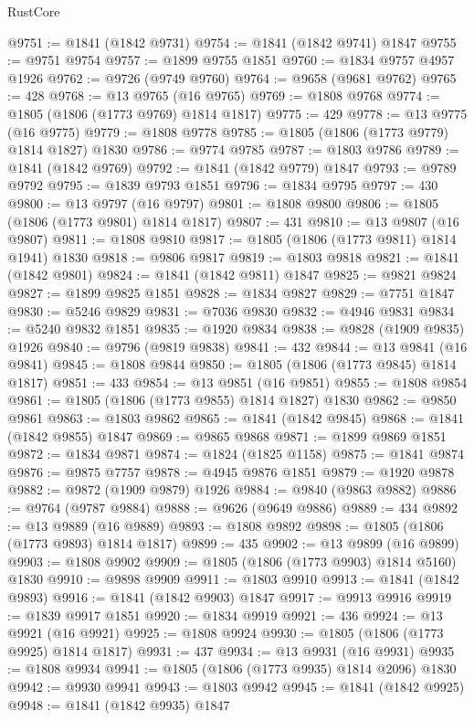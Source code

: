 \begin{lexlean}{RustCore}
\begin{coremodule}
@9751 := @1841 (@1842 @9731)
@9754 := @1841 (@1842 @9741) @1847
@9755 := @9751 @9754
@9757 := @1899 @9755 @1851
@9760 := @1834 @9757 @4957 @1926
@9762 := @9726 (@9749 @9760)
@9764 := @9658 (@9681 @9762)
@9765 := 428
@9768 := @13 @9765 (@16 @9765)
@9769 := @1808 @9768
@9774 := @1805 (@1806 (@1773 @9769) @1814 @1817)
@9775 := 429
@9778 := @13 @9775 (@16 @9775)
@9779 := @1808 @9778
@9785 := @1805 (@1806 (@1773 @9779) @1814 @1827) @1830
@9786 := @9774 @9785
@9787 := @1803 @9786
@9789 := @1841 (@1842 @9769)
@9792 := @1841 (@1842 @9779) @1847
@9793 := @9789 @9792
@9795 := @1839 @9793 @1851
@9796 := @1834 @9795
@9797 := 430
@9800 := @13 @9797 (@16 @9797)
@9801 := @1808 @9800
@9806 := @1805 (@1806 (@1773 @9801) @1814 @1817)
@9807 := 431
@9810 := @13 @9807 (@16 @9807)
@9811 := @1808 @9810
@9817 := @1805 (@1806 (@1773 @9811) @1814 @1941) @1830
@9818 := @9806 @9817
@9819 := @1803 @9818
@9821 := @1841 (@1842 @9801)
@9824 := @1841 (@1842 @9811) @1847
@9825 := @9821 @9824
@9827 := @1899 @9825 @1851
@9828 := @1834 @9827
@9829 := @7751 @1847
@9830 := @5246 @9829
@9831 := @7036 @9830
@9832 := @4946 @9831
@9834 := @5240 @9832 @1851
@9835 := @1920 @9834
@9838 := @9828 (@1909 @9835) @1926
@9840 := @9796 (@9819 @9838)
@9841 := 432
@9844 := @13 @9841 (@16 @9841)
@9845 := @1808 @9844
@9850 := @1805 (@1806 (@1773 @9845) @1814 @1817)
@9851 := 433
@9854 := @13 @9851 (@16 @9851)
@9855 := @1808 @9854
@9861 := @1805 (@1806 (@1773 @9855) @1814 @1827) @1830
@9862 := @9850 @9861
@9863 := @1803 @9862
@9865 := @1841 (@1842 @9845)
@9868 := @1841 (@1842 @9855) @1847
@9869 := @9865 @9868
@9871 := @1899 @9869 @1851
@9872 := @1834 @9871
@9874 := @1824 (@1825 @1158)
@9875 := @1841 @9874
@9876 := @9875 @7757
@9878 := @4945 @9876 @1851
@9879 := @1920 @9878
@9882 := @9872 (@1909 @9879) @1926
@9884 := @9840 (@9863 @9882)
@9886 := @9764 (@9787 @9884)
@9888 := @9626 (@9649 @9886)
@9889 := 434
@9892 := @13 @9889 (@16 @9889)
@9893 := @1808 @9892
@9898 := @1805 (@1806 (@1773 @9893) @1814 @1817)
@9899 := 435
@9902 := @13 @9899 (@16 @9899)
@9903 := @1808 @9902
@9909 := @1805 (@1806 (@1773 @9903) @1814 @5160) @1830
@9910 := @9898 @9909
@9911 := @1803 @9910
@9913 := @1841 (@1842 @9893)
@9916 := @1841 (@1842 @9903) @1847
@9917 := @9913 @9916
@9919 := @1839 @9917 @1851
@9920 := @1834 @9919
@9921 := 436
@9924 := @13 @9921 (@16 @9921)
@9925 := @1808 @9924
@9930 := @1805 (@1806 (@1773 @9925) @1814 @1817)
@9931 := 437
@9934 := @13 @9931 (@16 @9931)
@9935 := @1808 @9934
@9941 := @1805 (@1806 (@1773 @9935) @1814 @2096) @1830
@9942 := @9930 @9941
@9943 := @1803 @9942
@9945 := @1841 (@1842 @9925)
@9948 := @1841 (@1842 @9935) @1847

\end{coremodule}
\end{lexlean}
